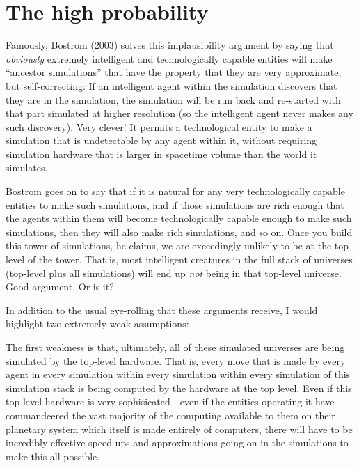 \section{The high probability}

Famously, Bostrom (2003) solves this implausibility argument by saying
that \emph{obviously} extremely intelligent and technologically
capable entities will make ``ancestor simulations'' that have the
property that they are very approximate, but self-correcting: If an
intelligent agent within the simulation discovers that they are in the
simulation, the simulation will be run back and re-started with that
part simulated at higher resolution (so the intelligent agent never
makes any such discovery). Very clever! It permits a technological entity
to make a simulation that is undetectable by any agent within it, without
requiring simulation hardware that is larger in spacetime volume than
the world it simulates.

Bostrom goes on to say that if it is natural for any very
technologically capable entities to make such simulations, and if
those simulations are rich enough that the agents within them will
become technologically capable enough to make such simulations, then
they will also make rich simulations, and so on. Once you build this
tower of simulations, he claims, we are exceedingly unlikely to be at
the top level of the tower.
That is, most intelligent creatures in the full stack
of universes (top-level plus all simulations) will end up \emph{not}
being in that top-level universe. Good argument. Or is it?

In addition to the usual eye-rolling that these arguments receive, I
would highlight two extremely weak assumptions:

The first weakness is that, ultimately, all of these simulated
universes are being simulated by the top-level hardware. That is,
every move that is made by every agent in every simulation within
every simulation within every simulation of this simulation stack is
being computed by the hardware at the top level. Even if this
top-level hardware is very sophisicated---even if the entities
operating it have commandeered the vast majority of the computing
available to them on their planetary system which itself is made
entirely of computers, there will have to be incredibly effective
speed-ups and approximations going on in the simulations to make this
all possible.

